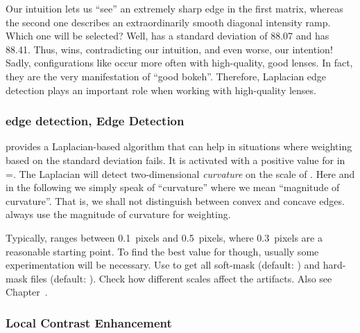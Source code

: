Our intuition lets us ``see'' an extremely sharp edge in the first matrix, whereas the second
one describes an extraordinarily smooth diagonal intensity ramp.  Which one will be selected?
Well,  has a standard deviation of 88.07 and  has 88.41.
Thus,  wins, contradicting our intuition, and even worse, our intention!
Sadly, configurations like  occur more often with high-quality, good
 lenses.  In fact, they are the very manifestation of
``good bokeh''.  Therefore, Laplacian edge detection plays an important role when working with
high-quality lenses.


\subsubsection[\propername{Laplacian} Edge Detection]{\label{sec:laplacian-edge-detection}%
         {edge detection, }%
   Edge Detection}

\App{} provides a Laplacian-based algorithm that can help in situations where weighting based on
the standard deviation fails.  It is activated with a positive value for  in
=.  The Laplacian will detect two-dimensional
\emph{curvature} on the scale of .  Here and in the following we simply speak of
``curvature'' where we mean ``magnitude of curvature''.  That is, we shall not distinguish
between convex and concave edges.  \App{} always use the magnitude of curvature for weighting.

Typically,  ranges between 0.1~pixels and 0.5~pixels, where 0.3~pixels are a
reasonable starting point.  To find the best value for  though, usually some
experimentation will be necessary.  Use  to get all soft-mask (default:
\mbox{}) and hard-mask files (default:
\mbox{}).  Check how different scales affect the
artifacts.  Also see Chapter~.


\subsubsection[Local Contrast Enhancement]{\label{sec:local-contrast-enhancement}%
  Local Contrast Enhancement}


